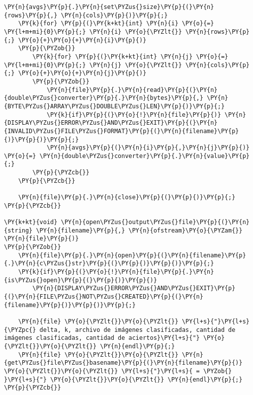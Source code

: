 \begin{Verbatim}[commandchars=\\\{\}]
    \PY{n}{avgs}\PY{p}{.}\PY{n}{set\PYZus{}size}\PY{p}{(}\PY{n}{rows}\PY{p}{,} \PY{n}{cols}\PY{p}{)}\PY{p}{;}
    \PY{k}{for} \PY{p}{(}\PY{k+kt}{int} \PY{n}{i} \PY{o}{=} \PY{l+m+mi}{0}\PY{p}{;} \PY{n}{i} \PY{o}{\PYZlt{}} \PY{n}{rows}\PY{p}{;} \PY{o}{+}\PY{o}{+}\PY{n}{i}\PY{p}{)}
    \PY{p}{\PYZob{}}
    	\PY{k}{for} \PY{p}{(}\PY{k+kt}{int} \PY{n}{j} \PY{o}{=} \PY{l+m+mi}{0}\PY{p}{;} \PY{n}{j} \PY{o}{\PYZlt{}} \PY{n}{cols}\PY{p}{;} \PY{o}{+}\PY{o}{+}\PY{n}{j}\PY{p}{)}
    	\PY{p}{\PYZob{}}
    		\PY{n}{file}\PY{p}{.}\PY{n}{read}\PY{p}{(}\PY{n}{double\PYZus{}converter}\PY{p}{.}\PY{n}{bytes}\PY{p}{,} \PY{n}{BYTE\PYZus{}ARRAY\PYZus{}DOUBLE\PYZus{}LEN}\PY{p}{)}\PY{p}{;}
    		\PY{k}{if}\PY{p}{(}\PY{o}{!}\PY{n}{file}\PY{p}{)} \PY{n}{DISPLAY\PYZus{}ERROR\PYZus{}AND\PYZus{}EXIT}\PY{p}{(}\PY{n}{INVALID\PYZus{}FILE\PYZus{}FORMAT}\PY{p}{(}\PY{n}{filename}\PY{p}{)}\PY{p}{)}\PY{p}{;}
    		\PY{n}{avgs}\PY{p}{(}\PY{n}{i}\PY{p}{,}\PY{n}{j}\PY{p}{)} \PY{o}{=} \PY{n}{double\PYZus{}converter}\PY{p}{.}\PY{n}{value}\PY{p}{;}
    	\PY{p}{\PYZcb{}}
    \PY{p}{\PYZcb{}}

	\PY{n}{file}\PY{p}{.}\PY{n}{close}\PY{p}{(}\PY{p}{)}\PY{p}{;}
\PY{p}{\PYZcb{}}

\PY{k+kt}{void} \PY{n}{open\PYZus{}output\PYZus{}file}\PY{p}{(}\PY{n}{string} \PY{n}{filename}\PY{p}{,} \PY{n}{ofstream}\PY{o}{\PYZam{}} \PY{n}{file}\PY{p}{)}
\PY{p}{\PYZob{}}
	\PY{n}{file}\PY{p}{.}\PY{n}{open}\PY{p}{(}\PY{n}{filename}\PY{p}{.}\PY{n}{c\PYZus{}str}\PY{p}{(}\PY{p}{)}\PY{p}{)}\PY{p}{;}
	\PY{k}{if}\PY{p}{(}\PY{o}{!}\PY{n}{file}\PY{p}{.}\PY{n}{is\PYZus{}open}\PY{p}{(}\PY{p}{)}\PY{p}{)}
		\PY{n}{DISPLAY\PYZus{}ERROR\PYZus{}AND\PYZus{}EXIT}\PY{p}{(}\PY{n}{FILE\PYZus{}NOT\PYZus{}CREATED}\PY{p}{(}\PY{n}{filename}\PY{p}{)}\PY{p}{)}\PY{p}{;}

	\PY{n}{file} \PY{o}{\PYZlt{}}\PY{o}{\PYZlt{}} \PY{l+s}{"}\PY{l+s}{\PYZpc{} delta, k, archivo de imágenes clasificadas, cantidad de imágenes clasificadas, cantidad de aciertos}\PY{l+s}{"} \PY{o}{\PYZlt{}}\PY{o}{\PYZlt{}} \PY{n}{endl}\PY{p}{;}
	\PY{n}{file} \PY{o}{\PYZlt{}}\PY{o}{\PYZlt{}} \PY{n}{get\PYZus{}file\PYZus{}basename}\PY{p}{(}\PY{n}{filename}\PY{p}{)} \PY{o}{\PYZlt{}}\PY{o}{\PYZlt{}} \PY{l+s}{"}\PY{l+s}{ = \PYZob{} }\PY{l+s}{"} \PY{o}{\PYZlt{}}\PY{o}{\PYZlt{}} \PY{n}{endl}\PY{p}{;}
\PY{p}{\PYZcb{}}


\end{Verbatim}
